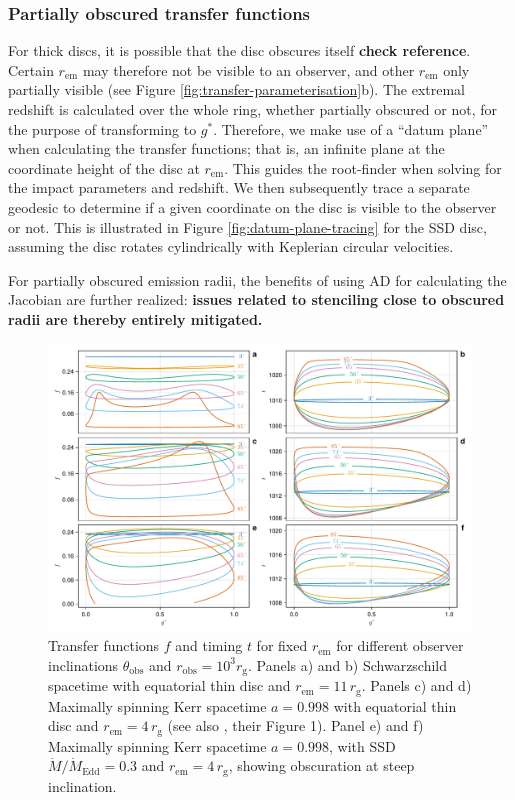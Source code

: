 \documentclass[fleqn,usenatbib]{mnras}
\newcommand{\todo}[1]{{\bf \color{red} #1}}
\newcommand{\rg}{r_\text{g}}
\begin{document}
\subsubsection{Partially obscured transfer functions}

For thick discs, it is possible that the disc obscures itself \citep{taylor_x-ray_2018} \todo{check reference}. Certain $r_\text{em}$ may therefore not be visible to an observer, and other $r_\text{em}$ only partially visible (see Figure \ref{fig:transfer-parameterisation}b). The extremal redshift is calculated over the whole ring, whether partially obscured or not, for the purpose of transforming to $g^\ast$. Therefore, we make use of a ``datum plane'' when calculating the transfer functions; that is, an infinite plane at the coordinate height of the disc at $r_\text{em}$. This guides the root-finder when solving for the impact parameters and redshift. We then subsequently trace a separate geodesic to determine if a given coordinate on the disc is visible to the observer or not. This is illustrated in Figure \ref{fig:datum-plane-tracing} for the SSD disc, assuming the disc rotates cylindrically with Keplerian circular velocities.

For partially obscured emission radii, the benefits of using AD for calculating the Jacobian are further realized: \todo{issues related to stenciling close to obscured radii are thereby entirely mitigated.}


\begin{figure}
    \centering
    \includegraphics[width=0.99\linewidth]{figures/transfer-functions.plots.pdf}
    \caption{Transfer functions $f$ and timing $t$ for fixed $r_\text{em}$ for different observer inclinations $\theta_\text{obs}$ and $r_\text{obs} = 10^3 \rg$. Panels a) and b) Schwarzschild spacetime with equatorial thin disc and $r_\text{em} = 11\, \rg$. Panels c) and d) Maximally spinning Kerr spacetime $a=0.998$ with equatorial thin disc and $r_\text{em} = 4 \, \rg$ (see also \citealp{bambi_testing_2017}, their Figure 1). Panel e) and f) Maximally spinning Kerr spacetime $a=0.998$, with SSD $\dot{M} / \dot{M}_\text{Edd} = 0.3$ and $r_\text{em} = 4\, \rg$, showing obscuration at steep inclination.}
    \label{fig:transfer-functions}
\end{figure}
\end{document}
